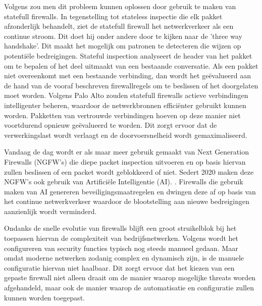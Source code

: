 Volgens \textcite{paloAltoSF2025} zou men dit probleem kunnen oplossen door gebruik te maken van statefull firewalls. In tegenstelling tot stateless inspectie die elk pakket afzonderlijk behandelt, ziet de statefull firewall het netwerkverkeer als een continue stroom. Dit doet hij onder andere door te kijken naar de 'three way handshake'. Dit maakt het mogelijk om patronen te detecteren die wijzen op potentiële bedreigingen. Stateful inspection analyseert de header van het pakket om te bepalen of het deel uitmaakt van een bestaande conversatie. Als een pakket niet overeenkomt met een bestaande verbinding, dan wordt het geëvalueerd aan de hand van de vooraf beschreven firewallregels om te beslissen of het doorgelaten moet worden. Volgens Palo Alto zouden statefull firewalls actieve verbindingen intelligenter beheren, waardoor de netwerkbronnen efficiënter gebruikt kunnen worden. Pakketten van vertrouwde verbindingen hoeven op deze manier niet voortdurend opnieuw geëvalueerd te worden. Dit zorgt ervoor dat de verwerkingslast wordt verlaagt en de doorvoersnelheid wordt gemaximaliseerd. 

Vandaag de dag wordt er als maar meer gebruik gemaakt van Next Generation Firewalls (NGFW’s) die diepe packet inspection uitvoeren en op basis hiervan zullen beslissen of een packet wordt geblokkeerd of niet. Sedert 2020 maken deze NGFW’s ook gebruik van Artificiële Intelligentie (AI). \autocite{Ahmadi2023}. Firewalls die gebruik maken van AI genereren beveiligingsmaatregelen en dwingen deze af op basis van het continue netwerkverkeer waardoor de blootstelling aan nieuwe bedreigingen aanzienlijk wordt verminderd. \autocite{PaloAltoFW2024}

Ondanks de snelle evolutie van firewalls blijft een groot struikelblok bij het toepassen hiervan de complexiteit van bedrijfsnetwerken. Volgens \textcite{Bringhenti2023} wordt het configureren van security functies typisch nog steeds manueel gedaan. Maar omdat moderne netwerken zodanig complex en dynamisch zijn, is de manuele configuratie hiervan niet haalbaar. Dit zorgt ervoor dat het kiezen van een gepaste firewall niet alleen draait om de manier waarop mogelijke threats worden afgehandeld, maar ook de manier waarop de automatisatie en configuratie zullen kunnen worden toegepast.




